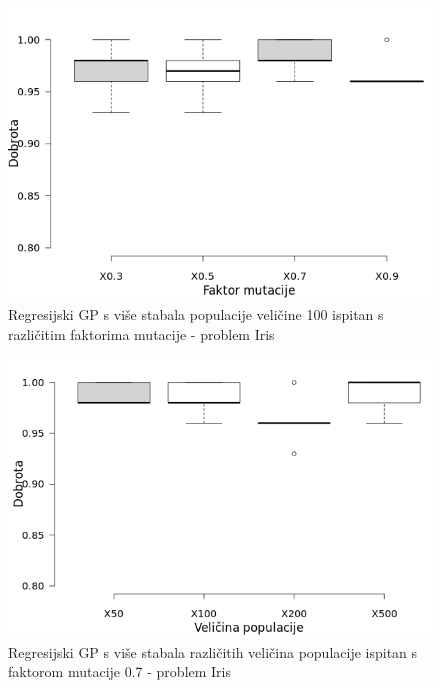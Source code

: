 \documentclass[times, utf8, zavrsni]{fer}
\begin{document}
\begin{figure}[htb]
\centering
\includegraphics[scale=0.5]{grafovi/boxplotIrisMTest3}
\caption{Regresijski GP s više stabala populacije veličine 100 ispitan s različitim faktorima mutacije - problem Iris}
\end{figure}

\begin{figure}[htb]
\centering
\includegraphics[scale=0.5]{grafovi/boxplotIrisM2}
\caption{Regresijski GP s više stabala različitih veličina populacije ispitan s faktorom mutacije 0.7 - problem Iris}
\end{figure}
\end{document}
